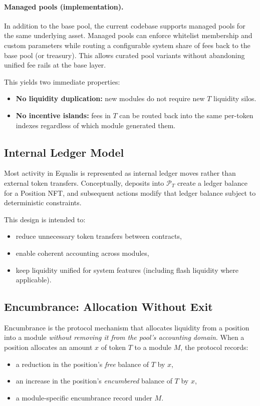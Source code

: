 \documentclass[version=preprint]{iacrcc}
\begin{document}
\paragraph{Managed pools (implementation).}
In addition to the base pool, the current codebase supports managed pools for the same underlying asset. Managed pools can enforce whitelist membership and custom parameters while routing a configurable system share of fees back to the base pool (or treasury). This allows curated pool variants without abandoning unified fee rails at the base layer.

This yields two immediate properties:
\begin{itemize}
  \item \textbf{No liquidity duplication:} new modules do not require new $T$ liquidity silos.
  \item \textbf{No incentive islands:} fees in $T$ can be routed back into the same per-token indexes regardless of which module generated them.
\end{itemize}

\subsection{Internal Ledger Model}

Most activity in Equalis is represented as internal ledger moves rather than external token transfers. Conceptually, deposits into $\mathcal{P}_T$ create a ledger balance for a Position NFT, and subsequent actions modify that ledger balance subject to deterministic constraints.

This design is intended to:
\begin{itemize}
  \item reduce unnecessary token transfers between contracts,
  \item enable coherent accounting across modules,
  \item keep liquidity unified for system features (including flash liquidity where applicable).
\end{itemize}

\subsection{Encumbrance: Allocation Without Exit}

Encumbrance is the protocol mechanism that allocates liquidity from a position into a module \textit{without removing it from the pool’s accounting domain}. When a position allocates an amount $x$ of token $T$ to a module $M$, the protocol records:
\begin{itemize}
  \item a reduction in the position's \textit{free} balance of $T$ by $x$,
  \item an increase in the position's \textit{encumbered} balance of $T$ by $x$,
  \item a module-specific encumbrance record under $M$.
\end{itemize}
\end{document}

